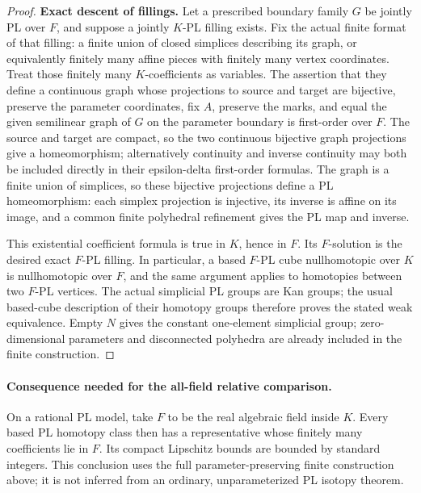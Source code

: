 \begin{proof}
\textbf{Exact descent of fillings.}
Let a prescribed boundary family \(G\) be jointly PL over \(F\), and suppose a jointly \(K\)-PL filling exists. Fix the actual finite format of that filling: a finite union of closed simplices describing its graph, or equivalently finitely many affine pieces with finitely many vertex coordinates. Treat those finitely many \(K\)-coefficients as variables. The assertion that they define a continuous graph whose projections to source and target are bijective, preserve the parameter coordinates, fix \(A\), preserve the marks, and equal the given semilinear graph of \(G\) on the parameter boundary is first-order over \(F\). The source and target are compact, so the two continuous bijective graph projections give a homeomorphism; alternatively continuity and inverse continuity may both be included directly in their epsilon-delta first-order formulas. The graph is a finite union of simplices, so these bijective projections define a PL homeomorphism: each simplex projection is injective, its inverse is affine on its image, and a common finite polyhedral refinement gives the PL map and inverse.

This existential coefficient formula is true in \(K\), hence in \(F\). Its \(F\)-solution is the desired exact \(F\)-PL filling. In particular, a based \(F\)-PL cube nullhomotopic over \(K\) is nullhomotopic over \(F\), and the same argument applies to homotopies between two \(F\)-PL vertices. The actual simplicial PL groups are Kan groups; the usual based-cube description of their homotopy groups therefore proves the stated weak equivalence. Empty \(N\) gives the constant one-element simplicial group; zero-dimensional parameters and disconnected polyhedra are already included in the finite construction.
\end{proof}

\paragraph{Consequence needed for the all-field relative comparison.}
On a rational PL model, take \(F\) to be the real algebraic field inside \(K\). Every based PL homotopy class then has a representative whose finitely many coefficients lie in \(F\). Its compact Lipschitz bounds are bounded by standard integers. This conclusion uses the full parameter-preserving finite construction above; it is not inferred from an ordinary, unparameterized PL isotopy theorem.
